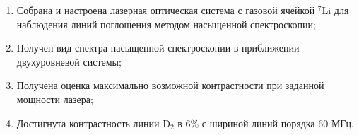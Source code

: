 \begin{enumerate}
    \item Собрана и настроена лазерная оптическая система с газовой ячейкой ${}^7$Li для наблюдения линий поглощения методом насыщенной спектроскопии;
    \item Получен вид спектра насыщенной спектроскопии в приближении двухуровневой системы;
    \item Получена оценка максимально возможной контрастности при заданной мощности лазера;
    \item Достигнута контрастность линии D$_2$ в 6\% с шириной линий порядка $60$ МГц.
\end{enumerate}
